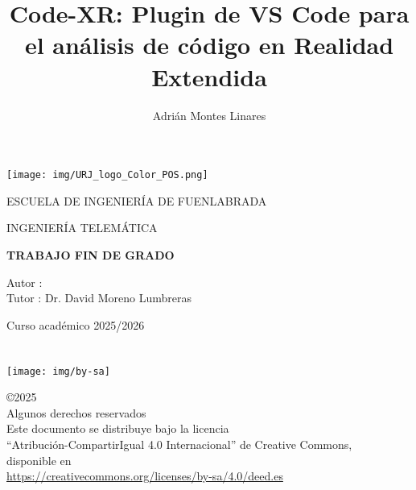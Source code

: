 \documentclass[a4paper, 12pt]{book}
\title{Code-XR: Plugin de VS Code para el análisis de código en Realidad Extendida}
\author{Adrián Montes Linares}
\makeatletter
\let\thetitle\@title
\let\theauthor\@author
\makeatother
\begin{document}
\renewcommand{\refname}{Bibliografía}  %
\renewcommand{\appendixname}{Apéndice}



\begin{titlepage}
\begin{center}
\texttt{[image: img/URJ\_logo\_Color\_POS.png]}

\vspace{1.75cm}

\LARGE
ESCUELA DE INGENIERÍA DE FUENLABRADA
\vspace{1cm}

\LARGE
INGENIERÍA TELEMÁTICA

\vspace{1cm}
\LARGE
\textbf{TRABAJO FIN DE GRADO}

\vspace{2cm}

\Large
\MakeUppercase{\thetitle}

\vspace{2cm}

\large
Autor : \theauthor \\
Tutor : Dr. David Moreno Lumbreras\\
\vspace{1cm}

\large
Curso académico 2025/2026

\end{center}
\end{titlepage}

\newpage
\mbox{}
\thispagestyle{empty} %



\clearpage
{}
\chapter*{}

\vspace{12cm}


\begin{flushright}
\texttt{[image: img/by-sa]}

\noindent©2025 \theauthor  \\
Algunos derechos reservados  \\
Este documento se distribuye bajo la licencia \\
``Atribución-CompartirIgual 4.0 Internacional'' de Creative Commons, \\
disponible en \\
\url{https://creativecommons.org/licenses/by-sa/4.0/deed.es}
\end{flushright}
\end{document}
